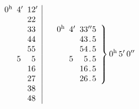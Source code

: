 \[
\begin{array}{r@{}l@{\enspace}r@{}l@{\enspace}r@{}l|}
0&{}^{\mathrm h}&4&{}'&12&{}'\\
&&&&22&\\
&&&&33&\\
&&&&44&\\
&&&&55&\\
&&5&&5&\\
&&&&16&\\
&&&&27&\\
&&&&38&\\
&&&&48&
\end{array}\quad
\left.\begin{array}{r@{}l@{\enspace}r@{}l@{\enspace}r@{}c@{}r}
0&{}^{\mathrm h}&4&{}'&33&{}''&5\\
&&&&43&{}.&5\\
&&&&54&{}.&5\\
&&5&&5&{}.&5\\
&&&&16&{}.&5\\
&&&&26&{}.&5
\end{array}\right\}0^{\mathrm h}\,5'\,0''
\]

